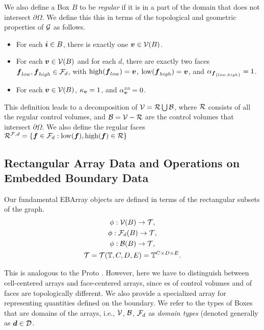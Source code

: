 \documentclass[12pt]{article}
\newcommand{\low}{{\rm{low}}}
\newcommand{\high}{{\rm{high}}}
\newcommand{\vof}{{\mbf{v}}}
\newcommand{\face}{{\mbf{f}}}
\newcommand{\dgen}{{\mbf{d}}}
\newcommand{\ebsub}{{\text{\it \tiny EB}}}
\begin{document}
We also define a Box $B$ to be {\it regular} if it is in a part of the domain that does not intersect $\partial \Omega$. We define this this in terms of the topological and geometric properties of ${\mathcal{G}}$ as follows.
\begin{itemize}
\item
For each ${\boldsymbol{i}} \in B$, there is exactly one $\vof \in \mcl{V}(B)$.
\item
For each $\vof \in \mcl{V}(B)$ and for each $d$, there are exactly two faces 
$\face_{low}, \face_{high} \in \mcl{F}_d$, with $\high(\face_{low}) = \vof$, $\low(\face_{high}) = \vof$, and $\alpha_{\face_{\{low,high\} }} = 1$.
\item
For each $\vof \in \mcl{V}(B)$, $\kappa_\vof = 1$, and $\alpha^\ebsub_\vof = 0$.
\end{itemize}

This definition leads to a decomposition of ${\mathcal{V}} = {\mathcal{R}} \bigcup {\mathcal{B}}$, where ${\mathcal{R}}$ consists of all the regular control volumes, and ${\mathcal{B}} = {\mathcal{V}} - {\mathcal{R}}$ are the control volumes that intersect $\partial \Omega$. We also define the regular faces  $\mcl{R}^{\mcl{F},d} = \{\face \in \mcl{F}_d : \low(\face),\high(\face) \in \mcl{R}\}$

\subsection{Rectangular Array Data and Operations on Embedded Boundary Data}

Our fundamental EBArray objects are defined in terms of the rectangular subsets of the graph.
\begin{gather*}
\phi : {\mathcal{V}}(B) \rightarrow {\mathcal{T}} ,\\
\phi : {\mathcal{F}}_d (B) \rightarrow {\mathcal{T}}, \\
\phi : {\mathcal{B}}(B) \rightarrow {\mathcal{T}}, \\
{\mathcal{T}} = {\mathcal{T}}(\mathbb{T},C,D,E) = \mathbb{T}^{C \times D \times E}.
\end{gather*}

This is analogous to the Proto . However, here we have to distinguish between cell-centered arrays and face-centered arrays, since es of control volumes and of faces are topologically different. We also provide a specialized array for representing quantities defined on the boundary. We refer to the types of Boxes that are domains of the arrays, i.e., ${\mathcal{V}}$, ${\mathcal{B}}$, ${\mathcal{F}}_d$ as {\it domain types} (denoted generally as $\dgen \in \mcl{D}$.
\end{document}
